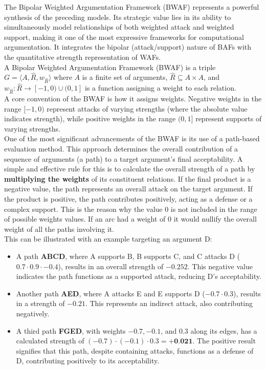 \documentclass{scrbook}
\begin{document}
The Bipolar Weighted Argumentation Framework (BWAF) represents a powerful synthesis of the preceding models. Its strategic value lies in its ability to simultaneously model relationships of both weighted attack and weighted support, making it one of the most expressive frameworks for computational argumentation. It integrates the bipolar (attack/support) nature of BAFs with the quantitative strength representation of WAFs. \\

A Bipolar Weighted Argumentation Framework (BWAF) is a triple $G=\langle A,\hat{R},w_{\hat{R}} \rangle$ where $A$ is a finite set of arguments, $\hat{R} \subseteq A \times A$, and $w_{\hat{R}}:\hat{R} \rightarrow [-1,0) \cup (0,1]$ is a function assigning a weight to each relation. \\

A core convention of the BWAF is how it assigns weights. Negative weights in the range $[-1, 0)$ represent attacks of varying strengths (where the absolute value indicates strength), while positive weights in the range $(0, 1]$ represent supports of varying strengths. \\

One of the most significant advancements of the BWAF is its use of a path-based evaluation method. This approach determines the overall contribution of a sequence of arguments (a path) to a target argument's final acceptability. A simple and effective rule for this is to calculate the overall strength of a path by \textbf{multiplying the weights} of its constituent relations. If the final product is a negative value, the path represents an overall attack on the target argument. If the product is positive, the path contributes positively, acting as a defense or a complex support. This is the reason why the value $0$ is not included in the range of possible weights values. If an arc had a weight of $0$ it would nullify the overall weight of all the paths involving it.\\

This can be illustrated with an example targeting an argument D:

\begin{itemize}
    \item 
    A path \textbf{ABCD}, where A supports B, B supports C, and C attacks D (\texttt{$0.7 \cdot 0.9 \cdot -0.4$}), results in an overall strength of \textbf{$-0.252$}. This negative value indicates the path functions as a supported attack, reducing D's acceptability.

    \item 
    Another path \textbf{AED}, where A attacks E and E supports D (\texttt{$-0.7 \cdot 0.3$}), results in a strength of \textbf{$-0.21$}. This represents an indirect attack, also contributing negatively.

    \item
    A third path \textbf{FGED}, with weights \texttt{$-0.7, -0.1$}, and \texttt{$0.3$} along its edges, has a calculated strength of \texttt{$(-0.7) \cdot (-0.1) \cdot 0.3 = \textbf{+0.021}$}. The positive result signifies that this path, despite containing attacks, functions as a defense of D, contributing positively to its acceptability.
\end{itemize}
\end{document}
